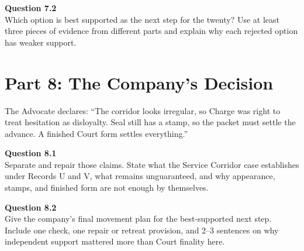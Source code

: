\documentclass[12pt]{article}
\begin{document}
\textbf{Question 7.2}\\[-0.15em]
Which option is best supported as the next step for the twenty? Use at least three pieces of evidence from different parts and explain why each rejected option has weaker support.

\newpage
\section*{Part 8: The Company's Decision}
The Advocate declares: ``The corridor looks irregular, so Charge was right to treat hesitation as disloyalty. Seal still has a stamp, so the packet must settle the advance. A finished Court form settles everything.''

\textbf{Question 8.1}\\[-0.15em]
Separate and repair those claims. State what the Service Corridor case establishes under Records U and V, what remains unguaranteed, and why appearance, stamps, and finished form are not enough by themselves.

\textbf{Question 8.2}\\[-0.15em]
Give the company's final movement plan for the best-supported next step. Include one check, one repair or retreat provision, and 2--3 sentences on why independent support mattered more than Court finality here.
\end{document}
